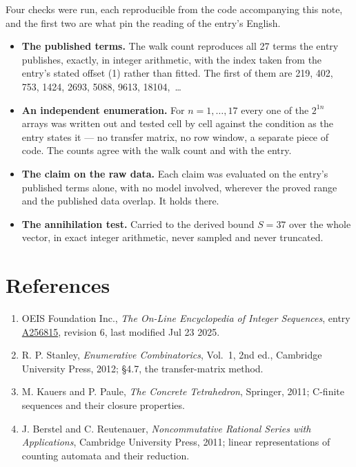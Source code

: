 \documentclass[11pt]{article}
\theoremstyle{definition}
\begin{document}
Four checks were run, each reproducible from the code accompanying this note, and the first two are what pin the reading of the entry's English.

\begin{itemize}

\item {\bfseries The published terms.} The walk count reproduces all 27 terms the entry publishes, exactly, in integer arithmetic, with the index taken from the entry's stated offset (1) rather than fitted. The first of them are 219, 402, 753, 1424, 2693, 5088, 9613, 18104,~\dots

\item {\bfseries An independent enumeration.} For $n = 1,\dots,17$ every one of the $2^{1n}$ arrays was written out and tested cell by cell against the condition as the entry states it --- no transfer matrix, no row window, a separate piece of code. The counts agree with the walk count and with the entry.

\item {\bfseries The claim on the raw data.} Each claim was evaluated on the entry's published terms alone, with no model involved, wherever the proved range and the published data overlap. It holds there.

\item {\bfseries The annihilation test.} Carried to the derived bound $S = 37$ over the whole vector, in exact integer arithmetic, never sampled and never truncated.

\end{itemize}

\section{References}

\begin{enumerate}

\item OEIS Foundation Inc., \emph{The On-Line Encyclopedia of Integer Sequences}, entry \href{https://oeis.org/A256815}{A256815}, revision 6, last modified Jul 23 2025.

\item R. P. Stanley, \emph{Enumerative Combinatorics}, Vol.~1, 2nd ed., Cambridge University Press, 2012; \S4.7, the transfer-matrix method.

\item M. Kauers and P. Paule, \emph{The Concrete Tetrahedron}, Springer, 2011; C-finite sequences and their closure properties.

\item J. Berstel and C. Reutenauer, \emph{Noncommutative Rational Series with Applications}, Cambridge University Press, 2011; linear representations of counting automata and their reduction.

\end{enumerate}
\end{document}
